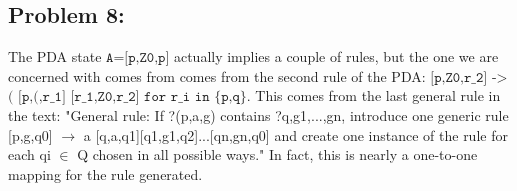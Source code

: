 \documentclass[a4paper]{article}
\begin{document}
\subsection*{Problem 8:} 

The PDA state $\texttt{A=[p,Z0,p]}$ actually implies a couple of rules, but the one we are concerned with comes from comes from the second rule of the PDA: $\texttt{[p,Z0,r\_2] ->}$ $\texttt{( [p,(,r\_1] [r\_1,Z0,r\_2] for r\_i in \{p,q\} }$. This comes from the last general rule in the text: "General rule: If ?(p,a,g) contains ?q,g1,...,gn, introduce one generic rule [p,g,q0] $\to$ a [q,a,q1][q1,g1,q2]...[qn,gn,q0]
 and create one instance of the rule for each qi $\in$ Q chosen in all possible ways." In fact, this is nearly a one-to-one mapping for the rule generated.
\end{document}
